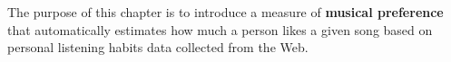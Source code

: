 
The purpose of this chapter is to introduce a measure of \textbf{musical preference} that automatically estimates how much a person likes a given song based on personal listening habits data collected from the Web.

% 
% 

% 
% 
% 


